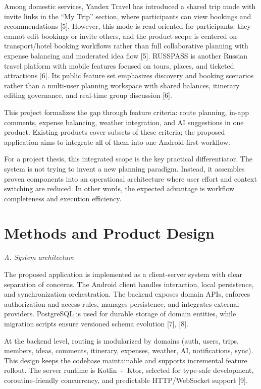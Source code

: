 \documentclass[10pt,twocolumn]{article}
\begin{document}
Among domestic services, Yandex Travel has introduced a shared trip mode with invite links in the ``My Trip'' section, where participants can view bookings and recommendations [5]. However, this mode is read-oriented for participants: they cannot edit bookings or invite others, and the product scope is centered on transport/hotel booking workflows rather than full collaborative planning with expense balancing and moderated idea flow [5]. RUSSPASS is another Russian travel platform with mobile features focused on tours, places, and ticketed attractions [6]. Its public feature set emphasizes discovery and booking scenarios rather than a multi-user planning workspace with shared balances, itinerary editing governance, and real-time group discussion [6].

This project formalizes the gap through feature criteria: route planning, in-app comments, expense balancing, weather integration, and AI suggestions in one product. Existing products cover subsets of these criteria; the proposed application aims to integrate all of them into one Android-first workflow.

For a project thesis, this integrated scope is the key practical differentiator. The system is not trying to invent a new planning paradigm. Instead, it assembles proven components into an operational architecture where user effort and context switching are reduced. In other words, the expected advantage is workflow completeness and execution efficiency.

\section{Methods and Product Design}

\textit{A. System architecture}

The proposed application is implemented as a client-server system with clear separation of concerns. The Android client handles interaction, local persistence, and synchronization orchestration. The backend exposes domain APIs, enforces authorization and access rules, manages persistence, and integrates external providers. PostgreSQL is used for durable storage of domain entities, while migration scripts ensure versioned schema evolution [7], [8].

At the backend level, routing is modularized by domains (auth, users, trips, members, ideas, comments, itinerary, expenses, weather, AI, notifications, sync). This design keeps the codebase maintainable and supports incremental feature rollout. The server runtime is Kotlin + Ktor, selected for type-safe development, coroutine-friendly concurrency, and predictable HTTP/WebSocket support [9].
\end{document}
